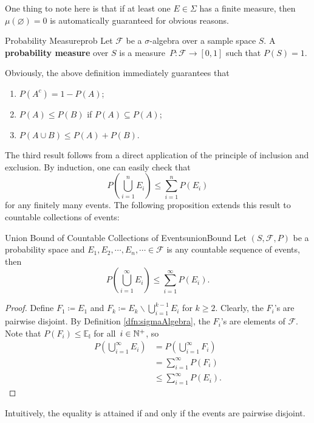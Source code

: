 \documentclass[math]{amznotes}
\theoremstyle{remark}
\newcommand{\0}{\mathbf{0}}
\newcommand{\1}{\mathbf{1}}
\begin{document}
One thing to note here is that if at least one $E \in \Sigma$ has a finite measure, then $\mu\left(\varnothing\right) = 0$ is automatically guaranteed for obvious reasons.
\begin{dfnbox}{Probability Measure}{prob}
    Let $\mathcal{F}$ be a $\sigma$-algebra over a sample space $S$. A {\color{red} \textbf{probability measure}} over $S$ is a measure~$P \colon \mathcal{F} \to \left[0, 1\right]$ such that $P\left(S\right) = 1$.
\end{dfnbox}
Obviously, the above definition immediately guarantees that 
\begin{enumerate}
    \item $P\left(A^c\right) = 1 - P\left(A\right)$;
    \item $P\left(A\right) \leq P\left(B\right)$ if $P\left(A\right) \subseteq P\left(A\right)$;
    \item $P\left(A \cup B\right) \leq P\left(A\right) + P\left(B\right)$.
\end{enumerate}
The third result follows from a direct application of the principle of inclusion and exclusion. By induction, one can easily check that 
\begin{equation*}
    P\left(\bigcup_{i = 1}^{n}E_i\right) \leq \sum_{i = 1}^{n}P\left(E_i\right)
\end{equation*}
for any finitely many events. The following proposition extends this result to countable collections of events:
\begin{probox}{Union Bound of Countable Collections of Events}{unionBound}
    Let $\left(S, \mathcal{F}, P\right)$ be a probability space and $E_1, E_2, \cdots, E_n, \cdots \in \mathcal{F}$ is any countable sequence of events, then 
    \begin{equation*}
        P\left(\bigcup_{i = 1}^{\infty}E_i\right) \leq \sum_{i = 1}^{\infty}P\left(E_i\right).
    \end{equation*}
    \tcblower
    \begin{proof}
        Define $F_1 \coloneqq E_1$ and $F_k \coloneqq E_k \backslash \bigcup_{i = 1}^{k - 1}E_i$ for $k \geq 2$. Clearly, the $F_i$'s are pairwise disjoint. By Definition \ref{dfn:sigmaAlgebra}, the $F_i$'s are elements of $\mathcal{F}$. Note that $P\left(F_i\right) \leq \mathbb{E_i}$ for all~$i \in \mathbb{N}^+$, so 
        \begin{align*}
            P\left(\bigcup_{i = 1}^{\infty}E_i\right) & = P\left(\bigcup_{i = 1}^{\infty}F_i\right) \\
            & = \sum_{i = 1}^{\infty}P\left(F_i\right) \\
            & \leq \sum_{i = 1}^{\infty}P\left(E_i\right).
        \end{align*}
    \end{proof}
\end{probox}
Intuitively, the equality is attained if and only if the events are pairwise disjoint. 
\end{document}

